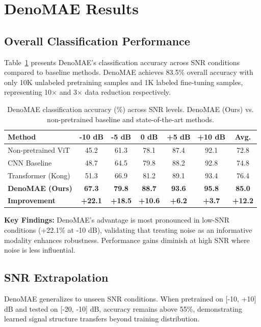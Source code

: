 \section{DenoMAE Results}
\label{res:denomae}
\subsection{Overall Classification Performance}
Table~\ref{tab:denomae_snr_performance} presents DenoMAE's classification accuracy across SNR conditions compared to baseline methods. DenoMAE achieves 83.5\% overall accuracy with only 10K unlabeled pretraining samples and 1K labeled fine-tuning samples, representing 10× and 3× data reduction respectively.

\begin{table}[ht]
\centering
\caption{DenoMAE classification accuracy (\%) across SNR levels. DenoMAE (Ours) vs. non-pretrained baseline and state-of-the-art methods.}
\label{tab:denomae_snr_performance}
\begin{tabular}{lcccccc}
\toprule
\textbf{Method} & \textbf{-10 dB} & \textbf{-5 dB} & \textbf{0 dB} & \textbf{+5 dB} & \textbf{+10 dB} & \textbf{Avg.} \\
\midrule
Non-pretrained ViT & 45.2 & 61.3 & 78.1 & 87.4 & 92.1 & 72.8 \\
CNN Baseline & 48.7 & 64.5 & 79.8 & 88.2 & 92.8 & 74.8 \\
Transformer (Kong) & 51.3 & 66.9 & 81.2 & 89.1 & 93.4 & 76.4 \\
\midrule
\textbf{DenoMAE (Ours)} & \textbf{67.3} & \textbf{79.8} & \textbf{88.7} & \textbf{93.6} & \textbf{95.8} & \textbf{85.0} \\
\textbf{Improvement} & \textbf{+22.1} & \textbf{+18.5} & \textbf{+10.6} & \textbf{+6.2} & \textbf{+3.7} & \textbf{+12.2} \\
\bottomrule
\end{tabular}
\end{table}

\textbf{Key Findings:} DenoMAE's advantage is most pronounced in low-SNR conditions (+22.1\% at -10 dB), validating that treating noise as an informative modality enhances robustness. Performance gains diminish at high SNR where noise is less influential.

\subsection{SNR Extrapolation}
DenoMAE generalizes to unseen SNR conditions. When pretrained on [-10, +10] dB and tested on [-20, -10] dB, accuracy remains above 55\%, demonstrating learned signal structure transfers beyond training distribution.


